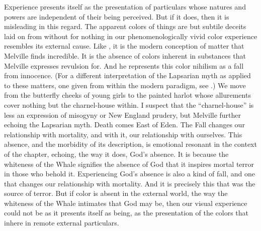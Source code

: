 Experience presents itself as the presentation of particulars whose natures and powers are independent of their being perceived. But if it does, then it is misleading in this regard. The apparent colors of things are but subtile deceits laid on from without for nothing in our phenomenologically vivid color experience resembles its external cause. Like \citealt[chapter one]{Bergson:1912pi}, it is the modern conception of matter that Melville finds incredible. It is the absence of colors inherent in substances that Melville expresses revulsion for. And he represents this color nihilism as a fall from innocence. (For a different interpretation of the Lapsarian myth as applied to these matters, one given from within the modern paradigm, see \citealt{Chalmers:2006kx}.) We move from the butterfly cheeks of young girls to the painted harlot whose allurements cover nothing but the charnel-house within. I suspect that the ``charnel-house'' is less an expression of misogyny or New England prudery, but Melville further echoing the Lapsarian myth. Death comes East of Eden. The Fall changes our relationship with mortality, and with it, our relationship with ourselves. This absence, and the morbidity of its description, is emotional resonant in the context of the chapter, echoing, the way it does, God's absence. It is because the whiteness of the Whale signifies the absence of God that it inspires mortal terror in those who behold it. Experiencing God's absence is also a kind of fall, and one that changes our relationship with mortality. And it is precisely this that was the source of terror. But if color is absent in the external world, the way the whiteness of the Whale intimates that God may be, then our visual experience could not be as it presents itself as being, as the presentation of the colors that inhere in remote external particulars.


